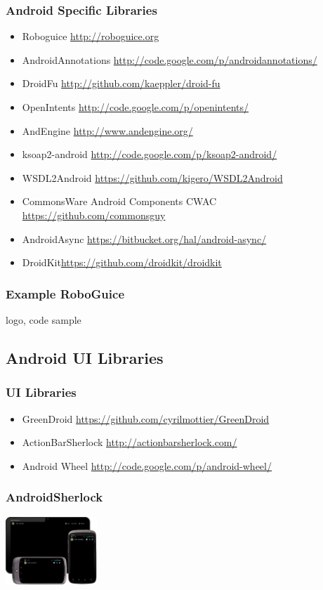\documentclass{beamer}
\begin{document}
    \begin{frame}
      \frametitle{Android Specific Libraries}
      \begin{itemize}
        \item<1->Roboguice \url{http://roboguice.org} 
        \item<2->AndroidAnnotations \url{http://code.google.com/p/androidannotations/}
        \item<3->DroidFu \url{http://github.com/kaeppler/droid-fu}
        \item<4->OpenIntents \url{http://code.google.com/p/openintents/}
        \item<5->AndEngine \url{http://www.andengine.org/}
        \item<6->ksoap2-android \url{http://code.google.com/p/ksoap2-android/}
        \item<7->WSDL2Android \url{https://github.com/kigero/WSDL2Android}
        \item<8->CommonsWare Android Components CWAC \url{https://github.com/commonsguy}  
        \item<9->AndroidAsync \url{https://bitbucket.org/hal/android-async/}  
        \item DroidKit\url{https://github.com/droidkit/droidkit}
\end{itemize}
    \end{frame}

    \begin{frame}
     \frametitle{Example RoboGuice}
      logo, code sample
    \end{frame}
  

  \subsection{Android UI Libraries}

    \begin{frame}
      \frametitle{UI Libraries}
      \begin{itemize}
       \item<1-> GreenDroid \url{https://github.com/cyrilmottier/GreenDroid}
       \item<2-> ActionBarSherlock \url{http://actionbarsherlock.com/} 
       \item Android Wheel \url{http://code.google.com/p/android-wheel/}
      \end{itemize}

    \end{frame}

    \begin{frame}
      \frametitle{AndroidSherlock}
      \begin{center}
      \includegraphics[height=1.0in]{androidsherlock.png}
      \end{center}
    \end{frame}
\end{document}
